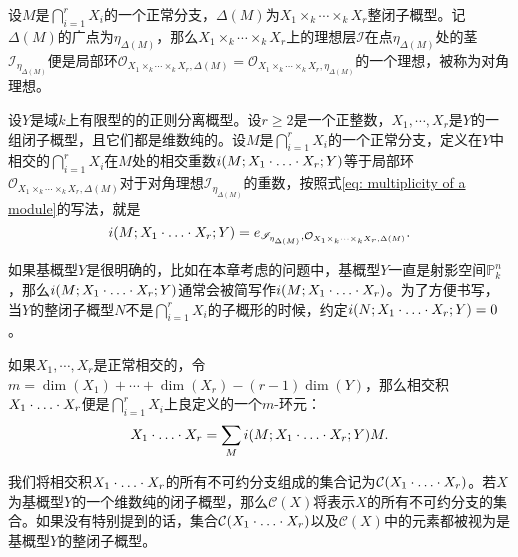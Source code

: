 设$M$是$\bigcap\limits_{i=1}^r X_i$的一个正常分支，$\Delta(M)$为$X_1\times_k\cdots\times_k X_r$整闭子概型。记$\Delta(M)$的广点为$\eta_{\Delta(M)}$，那么$X_1\times_k\cdots\times_k X_r$上的理想层$\mathscr{I}$在点$\eta_{\Delta(M)}$处的茎$\mathscr{I}_{\eta_{\Delta(M)}}$便是局部环$\mathcal{O}_{X_1\times_k\cdots\times_k X_r, \Delta(M)} = \mathcal{O}_{X_1\times_k\cdots\times_k X_r, \eta_{\Delta(M)}}$的一个理想，被称为对角理想。

\begin{definition} \label{multiplicity of proper component}
设$Y$是域$k$上有限型的的正则分离概型。设$r \geqslant 2$是一个正整数，$X_1,\cdots, X_r$是$Y$的一组闭子概型，且它们都是维数纯的。设$M$是$\bigcap\limits_{i=1}^r X_i$的一个正常分支，定义在$Y$中相交的$\bigcap\limits_{i=1}^r X_i$在$M$处的相交重数$i(M;X_1\cdot\ldots\cdot X_r;Y)$等于局部环$\mathcal{O}_{X_1\times_k\cdots\times_k X_r, \Delta(M)}$对于对角理想$\mathscr{I}_{\eta_{\Delta(M)}}$的重数，按照式\eqref{eq: multiplicity of a module}的写法，就是
\begin{equation} \label{eq: multiplicity of proper component}
i(M;X_1\cdot\ldots\cdot X_r;Y) = e_{\mathscr{I}_{\eta_{\Delta(M)}}
, \mathcal{O}_{X_1\times_k\cdots\times_k X_r, \Delta(M)}}.
\end{equation}
\end{definition}
如果基概型$Y$是很明确的，比如在本章考虑的问题中，基概型$Y$一直是射影空间$\mathbb{P}_k^n$，那么$i(M;X_1\cdot\ldots\cdot X_r;Y)$通常会被简写作$i(M;X_1\cdot\ldots\cdot X_r)$。为了方便书写，当$Y$的整闭子概型$N$不是$\bigcap\limits_{i=1}^r X_i$的子概形的时候，约定$i(N;X_1\cdot\ldots\cdot X_r;Y) = 0$。

如果$X_1,\cdots, X_r$是正常相交的，令$m = \dim(X_1) + \cdots + \dim(X_r) - (r-1)\dim(Y)$，那么相交积$X_1\cdot\ldots\cdot X_r$便是$\bigcap\limits_{i=1}^r X_i$上良定义的一个$m$-环元：
\begin{equation}
X_1\cdot\ldots\cdot X_r = \sum\limits_{M} i(M;X_1\cdot\ldots\cdot X_r;Y) {M}.
\end{equation}

我们将相交积$X_1\cdot\ldots\cdot X_r$的所有不可约分支组成的集合记为$\mathcal{C}(X_1\cdot\ldots\cdot X_r)$。若$X$为基概型$Y$的一个维数纯的闭子概型，那么$\mathcal{C}(X)$将表示$X$的所有不可约分支的集合。如果没有特别提到的话，集合$\mathcal{C}(X_1\cdot\ldots\cdot X_r)$以及$\mathcal{C}(X)$中的元素都被视为是基概型$Y$的整闭子概型。

